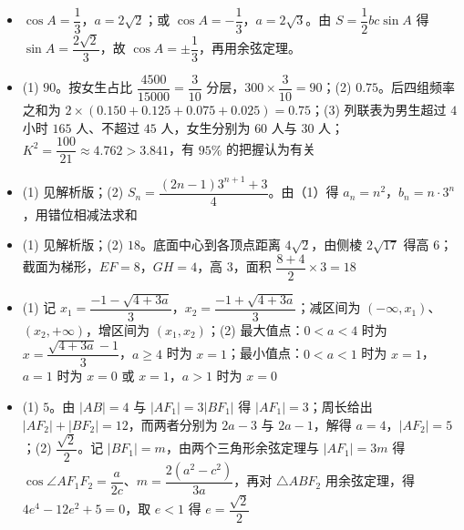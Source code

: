 \begin{itemize}[leftmargin=2.6em]
  \item[\textbf{16.}] $\cos A=\dfrac13$，$a=2\sqrt2$；或 $\cos A=-\dfrac13$，$a=2\sqrt3$。由 $S=\dfrac12bc\sin A$ 得 $\sin A=\dfrac{2\sqrt2}3$，故 $\cos A=\pm\dfrac13$，再用余弦定理。
  \item[\textbf{17.}] (1) $90$。按女生占比 $\dfrac{4500}{15000}=\dfrac3{10}$ 分层，$300\times\dfrac3{10}=90$；(2) $0.75$。后四组频率之和为 $2\times(0.150+0.125+0.075+0.025)=0.75$；(3) 列联表为男生超过 $4$ 小时 $165$ 人、不超过 $45$ 人，女生分别为 $60$ 人与 $30$ 人；$K^2=\dfrac{100}{21}\approx4.762>3.841$，有 $95\%$ 的把握认为有关
  \item[\textbf{18.}] (1) 见解析版；(2) $S_n=\dfrac{(2n-1)3^{n+1}+3}4$。由（1）得 $a_n=n^2$，$b_n=n\cdot3^n$，用错位相减法求和
  \item[\textbf{19.}] (1) 见解析版；(2) $18$。底面中心到各顶点距离 $4\sqrt2$，由侧棱 $2\sqrt{17}$ 得高 $6$；截面为梯形，$EF=8$，$GH=4$，高 $3$，面积 $\dfrac{8+4}2\times3=18$
  \item[\textbf{20.}] (1) 记 $x_1=\dfrac{-1-\sqrt{4+3a}}3$，$x_2=\dfrac{-1+\sqrt{4+3a}}3$；减区间为 $(-\infty,x_1)$、$(x_2,+\infty)$，增区间为 $(x_1,x_2)$；(2) 最大值点：$0<a<4$ 时为 $x=\dfrac{\sqrt{4+3a}-1}3$，$a\geqslant4$ 时为 $x=1$；最小值点：$0<a<1$ 时为 $x=1$，$a=1$ 时为 $x=0$ 或 $x=1$，$a>1$ 时为 $x=0$
  \item[\textbf{21.}] (1) $5$。由 $|AB|=4$ 与 $|AF_1|=3|BF_1|$ 得 $|AF_1|=3$；周长给出 $|AF_2|+|BF_2|=12$，而两者分别为 $2a-3$ 与 $2a-1$，解得 $a=4$，$|AF_2|=5$；(2) $\dfrac{\sqrt2}2$。记 $|BF_1|=m$，由两个三角形余弦定理与 $|AF_1|=3m$ 得 $\cos\angle AF_1F_2=\dfrac a{2c}$、$m=\dfrac{2(a^2-c^2)}{3a}$，再对 $\triangle ABF_2$ 用余弦定理，得 $4e^4-12e^2+5=0$，取 $e<1$ 得 $e=\dfrac{\sqrt2}2$
\end{itemize}

